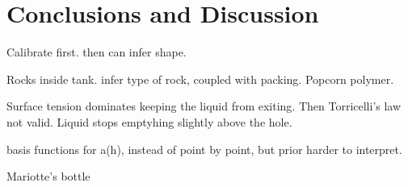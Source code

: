 \documentclass[openacc]{rsproca_new}%
\begin{document}
\section{Conclusions and Discussion}

Calibrate first. then can infer shape.

Rocks inside tank. infer type of rock, coupled with packing. Popcorn polymer.

Surface tension dominates keeping the liquid from exiting. Then Torricelli's law not valid. Liquid stops emptyhing slightly above the hole. 

basis functions for a(h), instead of point by point, but prior harder to interpret.

Mariotte's bottle \cite{kirevs2006mariotte}

\enlargethispage{20pt}




\vskip2pc



\end{document}
